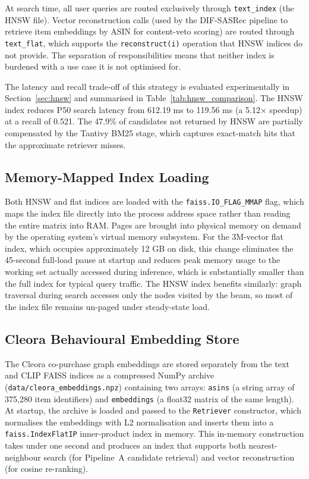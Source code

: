 At search time, all user queries are routed exclusively through \texttt{text\_index} (the HNSW file).
Vector reconstruction calls (used by the DIF-SASRec pipeline to retrieve item embeddings by ASIN for content-veto scoring) are routed through \texttt{text\_flat}, which supports the \texttt{reconstruct(i)} operation that HNSW indices do not provide.
The separation of responsibilities means that neither index is burdened with a use case it is not optimised for.

The latency and recall trade-off of this strategy is evaluated experimentally in Section~\ref{sec:hnsw} and summarised in Table~\ref{tab:hnsw_comparison}.
The HNSW index reduces P50 search latency from 612.19 ms to 119.56 ms (a 5.12$\times$ speedup) at a recall of 0.521.
The 47.9\% of candidates not returned by HNSW are partially compensated by the Tantivy BM25 stage, which captures exact-match hits that the approximate retriever misses.

\subsection{Memory-Mapped Index Loading}
\label{sec:mmap}

Both HNSW and flat indices are loaded with the \texttt{faiss.IO\_FLAG\_MMAP} flag, which maps the index file directly into the process address space rather than reading the entire matrix into RAM.
Pages are brought into physical memory on demand by the operating system's virtual memory subsystem.
For the 3M-vector flat index, which occupies approximately 12 GB on disk, this change eliminates the 45-second full-load pause at startup and reduces peak memory usage to the working set actually accessed during inference, which is substantially smaller than the full index for typical query traffic.
The HNSW index benefits similarly: graph traversal during search accesses only the nodes visited by the beam, so most of the index file remains un-paged under steady-state load.

\subsection{Cleora Behavioural Embedding Store}
\label{sec:cleora_store}

The Cleora co-purchase graph embeddings are stored separately from the text and CLIP FAISS indices as a compressed NumPy archive (\texttt{data/cleora\_embeddings.npz}) containing two arrays: \texttt{asins} (a string array of 375{,}280 item identifiers) and \texttt{embeddings} (a float32 matrix of the same length).
At startup, the archive is loaded and passed to the \texttt{Retriever} constructor, which normalises the embeddings with L2 normalisation and inserts them into a \texttt{faiss.IndexFlatIP} inner-product index in memory.
This in-memory construction takes under one second and produces an index that supports both nearest-neighbour search (for Pipeline~A candidate retrieval) and vector reconstruction (for cosine re-ranking).

